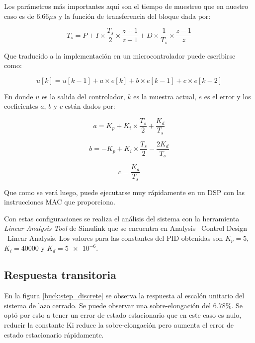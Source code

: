 \documentclass[12pt]{report}
\begin{document}
	Los parámetros más importantes aquí son el tiempo de muestreo que en nuestro caso es de $6.66 \mu s$ y la función de transferencia del bloque dada por:
	
	\begin{equation}
		T_s = P + I \times \frac{T_s}{2} \times \frac{z+1}{z-1} + D \times \frac{1}{T_s} \times \frac{z-1}{z}
		\label{pid:algorithm}
	\end{equation}
	
	Que traducido a la implementación en un microcontrolador puede escribirse como:
	
	\begin{equation}
		u[k] = u[k-1] + a \times e[k] + b \times e[k-1] + c \times e[k-2]
	\end{equation}
	
	En donde $u$ es la salida del controlador, $k$ es la muestra actual, $e$ es el error y los coeficientes $a$, $b$ y $c$ están dados por:
	
	\begin{equation}
		a = K_p + K_i \times \frac{T_s}{2} + \frac{K_d}{T_s}
	\end{equation}
	
	\begin{equation}
		b = -K_p + K_i \times \frac{T_s}{2} - \frac{2K_d}{T_s}
	\end{equation}
	
	\begin{equation}
		c = \frac{K_d}{T_s}
	\end{equation}
	
	Que como se verá luego, puede ejecutarse muy rápidamente en un DSP con las instrucciones MAC que proporciona.
	
	Con estas configuraciones se realiza el análisis del sistema con la herramienta \textit{Linear Analysis Tool} de Simulink que se encuentra en Analysis \textrightarrow \ Control Design \textrightarrow \ Linear Analysis. Los valores para las constantes del PID obtenidas son $K_p = 5$, $K_i = 40000$ y $K_d = \num{5e-6}$.
	
	\subsection{Respuesta transitoria}
	
	En la figura \ref{buck:step_discrete} se observa la respuesta al escalón unitario del sistema de lazo cerrado. Se puede observar una sobre-elongación del 6.78\%. Se optó por esto a tener un error de estado estacionario que en este caso es nulo, reducir la constante Ki reduce la sobre-elongación pero aumenta el error de estado estacionario rápidamente.
	
\end{document}
